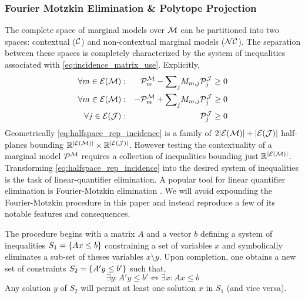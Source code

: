 \documentclass[aps, 10pt, english, twoside, pra, nofootinbib, longbibliography]{revtex4-1}
\begin{document}
     \\

     \\

     \\

    \subsubsection{Fourier Motzkin Elimination \& Polytope Projection}

    The complete space of marginal models over $\mathcal{M}$ can be partitioned into two spaces: contextual ($\mathcal{C}$) and non-contextual marginal models ($\mathcal{NC}$). The separation between these spaces is completely characterized by the system of inequalities associated with \cref{eq:incidence_matrix_use}. Explicitly,
    \begin{equation} \label{eq:halfspace_rep_incidence}
    \begin{alignedat}{2}
        \forall m \in \Events{\mscenario} :&&\quad \probvec^{\mscenario}_m - {\sum}_{j} M_{m, j} \probvec^{\jointvar}_j &\geq 0 \\
        \forall m \in \Events{\mscenario} :&&\quad -\probvec^{\mscenario}_m + {\sum}_{j} M_{m, j} \probvec^{\jointvar}_j &\geq 0 \\
        \forall j \in \Events{\jointvar} :&&\quad \probvec^{\jointvar}_j &\geq 0
    \end{alignedat}
    \end{equation}
    Geometrically \cref{eq:halfspace_rep_incidence} is a family of $2\abs{\Events{\mscenario}} + \abs{\Events{\jointvar}}$ half-planes bounding $\R^{\abs{\Events{\mscenario}}} \times \R^{\abs{\Events{\jointvar}}}$. However testing the contextuality of a marginal model $\probvec^{\mscenario}$ requires a collection of inequalities bounding just $\R^{\abs{\Events{\mscenario}}}$. Transforming \cref{eq:halfspace_rep_incidence} into the desired system of inequalities is the task of linear-quantifier elimination. A popular tool for linear quantifier elimination is Fourier-Motzkin elimination \cite{Dantzig_1973,Inflation,Abramsky_2012,jones_2004}. We will avoid expounding the Fourier-Motzkin procedure in this paper and instead reproduce a few of its notable features and consequences.

    \begin{definition} \cite[Section 12.2]{Schrijver_1998}
        The  procedure begins with a matrix $A$ and a vector $b$ defining a system of inequalities $S_1 = \bc{A\tcdot x \leq b}$ constraining a set of variables $x$ and symbolically eliminates a sub-set of theses variables $x \setminus y$. Upon completion, one obtains a new set of constraints $S_2 = \bc{A' y \leq b'}$ such that,
        \[ \exists y : A' y \leq b' \iff \exists x : A x \leq b \]
        Any solution $y$ of $S_2$ will permit at least one solution $x$ in $S_1$ (and vice versa).
    \end{definition}
\end{document}
